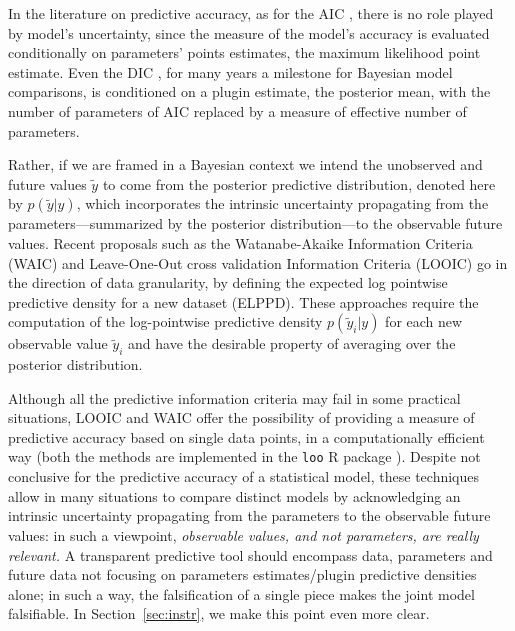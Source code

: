 \documentclass{statsoc}
\begin{document}
In the literature on predictive accuracy, as for the AIC \citep{akaike1973information}, there is no role played by model's uncertainty, since the 
measure of the model's accuracy is evaluated conditionally on parameters' points estimates, the maximum likelihood point estimate. Even the DIC \citep{spiegelhalter2002bayesian}, for many years a milestone for Bayesian model comparisons, is conditioned on a plugin estimate, the posterior mean, with the number of parameters of AIC replaced by a measure of effective number of parameters. 


Rather, if we are framed in a Bayesian context we intend the unobserved and future values $\tilde{y}$ to come from the posterior predictive distribution, denoted here by $p(\tilde{y}|y)$, which incorporates the intrinsic uncertainty propagating from the parameters---summarized by the posterior distribution---to the observable future values. 
Recent proposals such as the Watanabe-Akaike Information Criteria (WAIC) \citep{watanabe2010asymptotic} and Leave-One-Out cross validation Information Criteria (LOOIC) \citep{vehtari2017practical} go in the direction of data granularity, by defining the expected log pointwise predictive density
for a new dataset (ELPPD). These approaches require the computation of the log-pointwise predictive density $p(\tilde{y}_{i}|y)$ for each new observable value $\tilde{y}_i$ and have the desirable property
of averaging over the posterior distribution. 

Although all the predictive information criteria may fail in some practical situations, LOOIC and WAIC offer the possibility of providing a measure of predictive accuracy based on single data points, in a computationally efficient way (both the methods are 
implemented in the {\tt loo} R package \citep{loo}). Despite not conclusive for the predictive accuracy of a statistical model, these techniques allow in many situations to compare distinct models by acknowledging an intrinsic uncertainty propagating from the parameters to the observable future values: in such a viewpoint, \emph{observable values, and not parameters, are really relevant.}
 A transparent predictive tool should encompass data, parameters and future data not focusing on parameters estimates/plugin predictive densities alone; in such a way, the falsification of a single piece makes the joint model falsifiable. In Section~\ref{sec:instr}, we make this point even more clear.
\end{document}
